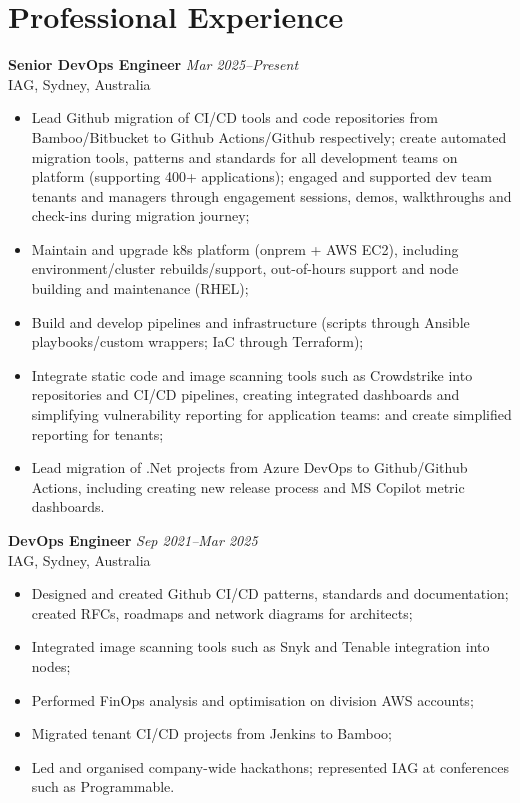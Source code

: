 \documentclass[11pt,letterpaper]{article}
\newcommand{\header}[1]{\textbf{\color{headercolor}#1}}
\begin{document}
\section*{Professional Experience}
\vspace{0.3em}
\header{Senior DevOps Engineer} \hfill \hfill \textit {Mar 2025--Present}\\
IAG, Sydney, Australia
\begin{itemize}[leftmargin=2em,itemsep=0.3ex]
  \item Lead Github migration of CI/CD tools and code repositories from Bamboo/Bitbucket to Github Actions/Github respectively; create automated migration tools, patterns and standards for all development teams on platform (supporting 400+ applications); engaged and supported dev team tenants and managers through engagement sessions, demos, walkthroughs and check-ins during migration journey;
  \item Maintain and upgrade k8s platform (onprem + AWS EC2), including environment/cluster rebuilds/support, out-of-hours support and node building and maintenance (RHEL);
  \item Build and develop pipelines and infrastructure (scripts through Ansible playbooks/custom wrappers; IaC through Terraform);
  \item Integrate static code and image scanning tools such as Crowdstrike into repositories and CI/CD pipelines, creating integrated dashboards and simplifying vulnerability reporting for application teams:
  \SubItem and create simplified reporting for tenants;
  \item Lead migration of .Net projects from Azure DevOps to Github/Github Actions, including creating new release process and MS Copilot metric dashboards.
\end{itemize}
\vspace{0.4em}
\header{DevOps Engineer} \hfill \hfill \textit {Sep 2021--Mar 2025}\\
IAG, Sydney, Australia
\begin{itemize}[leftmargin=2em,itemsep=0.3ex]
  \item Designed and created Github CI/CD patterns, standards and documentation; created RFCs, roadmaps and network diagrams for architects;  
  \item Integrated image scanning tools such as Snyk and Tenable integration into nodes;
  \item Performed FinOps analysis and optimisation on division AWS accounts;
  \item Migrated tenant CI/CD projects from Jenkins to Bamboo;
  \item Led and organised company-wide hackathons; represented IAG at conferences such as Programmable.
\end{itemize}
\end{document}
